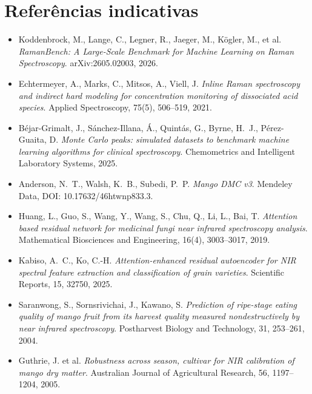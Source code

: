 \documentclass[11pt,a4paper]{article}
\begin{document}
\section{Referências indicativas}

\begin{itemize}
\item Koddenbrock, M., Lange, C., Legner, R., Jaeger, M., Kögler, M., et al. \emph{RamanBench: A Large-Scale Benchmark for Machine Learning on Raman Spectroscopy}. arXiv:2605.02003, 2026.
\item Echtermeyer, A., Marks, C., Mitsos, A., Viell, J. \emph{Inline Raman spectroscopy and indirect hard modeling for concentration monitoring of dissociated acid species}. Applied Spectroscopy, 75(5), 506--519, 2021.
\item Béjar-Grimalt, J., Sánchez-Illana, Á., Quintás, G., Byrne, H.~J., Pérez-Guaita, D. \emph{Monte Carlo peaks: simulated datasets to benchmark machine learning algorithms for clinical spectroscopy}. Chemometrics and Intelligent Laboratory Systems, 2025.
\item Anderson, N.~T., Walsh, K.~B., Subedi, P.~P. \emph{Mango DMC v3}. Mendeley Data, DOI: 10.17632/46htwnp833.3.
\item Huang, L., Guo, S., Wang, Y., Wang, S., Chu, Q., Li, L., Bai, T. \emph{Attention based residual network for medicinal fungi near infrared spectroscopy analysis}. Mathematical Biosciences and Engineering, 16(4), 3003--3017, 2019.
\item Kabiso, A.~C., Ko, C.-H. \emph{Attention-enhanced residual autoencoder for NIR spectral feature extraction and classification of grain varieties}. Scientific Reports, 15, 32750, 2025.
\item Saranwong, S., Sornsrivichai, J., Kawano, S. \emph{Prediction of ripe-stage eating quality of mango fruit from its harvest quality measured nondestructively by near infrared spectroscopy}. Postharvest Biology and Technology, 31, 253--261, 2004.
\item Guthrie, J. et al. \emph{Robustness across season, cultivar for NIR calibration of mango dry matter}. Australian Journal of Agricultural Research, 56, 1197--1204, 2005.
\end{itemize}
\end{document}
